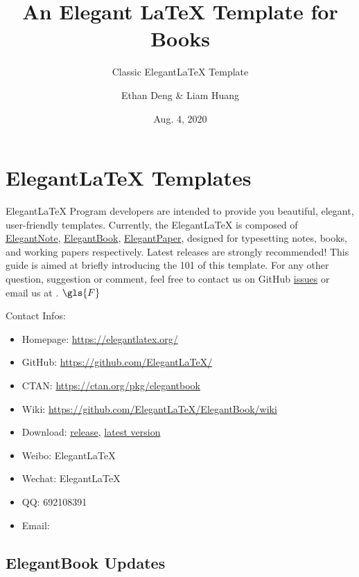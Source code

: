 \documentclass[11pt,fancy,twocol]{elegantbook}
\title{An Elegant \LaTeX{} Template for Books}
\subtitle{Classic Elegant\LaTeX{} Template}
\author{Ethan Deng \& Liam Huang}
\institute{Elegant\LaTeX{} Program}
\date{Aug. 4, 2020}
\begin{document}
\maketitle

\frontmatter
\tableofcontents

\mainmatter
\printunsrtglossary[type=symbols,style=long]


\chapter{Elegant\LaTeX{} Templates}
Elegant\LaTeX{} Program developers are intended to provide you beautiful, elegant, user-friendly templates. Currently, the Elegant\LaTeX{} is composed of \href{https://github.com/ElegantLaTeX/ElegantNote}{ElegantNote}, \href{https://github.com/ElegantLaTeX/ElegantBook}{ElegantBook}, \href{https://github.com/ElegantLaTeX/ElegantPaper}{ElegantPaper}, designed for typesetting notes, books, and working papers respectively. Latest releases are strongly recommended! This guide is aimed at briefly introducing the 101 of this template. For any other question, suggestion or comment, feel free to contact us on GitHub \href{https://github.com/ElegantLaTeX/ElegantBook/issues}{issues} or email us at . $\gls{F}$

Contact Infos:
\begin{itemize}
  \item Homepage: \href{https://elegantlatex.org/}{https://elegantlatex.org/}
  \item GitHub: \href{https://github.com/ElegantLaTeX/}{https://github.com/ElegantLaTeX/}
  \item CTAN: \href{https://ctan.org/pkg/elegantbook}{https://ctan.org/pkg/elegantbook}
  \item Wiki: \href{https://github.com/ElegantLaTeX/ElegantBook/wiki}{https://github.com/ElegantLaTeX/ElegantBook/wiki}
  \item Download: \href{https://github.com/ElegantLaTeX/ElegantBook/releases}{release}, \href{https://github.com/ElegantLaTeX/ElegantBook/archive/master.zip}{latest version}
  \item Weibo: Elegant\LaTeX{}
  \item Wechat: Elegant\LaTeX{}
  \item QQ: 692108391
  \item Email: 
\end{itemize}


\section{ElegantBook Updates}
\end{document}
